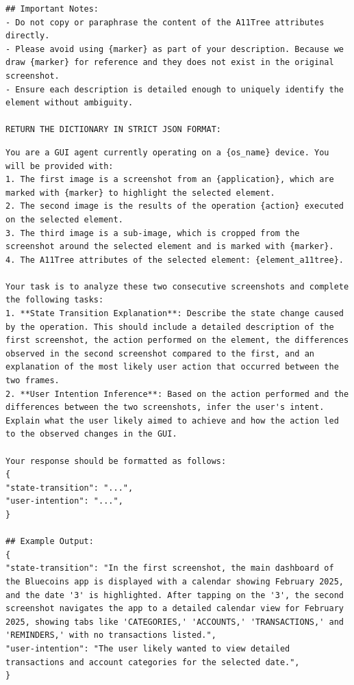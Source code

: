 \begin{tcolorbox}[title={Prompt For Element Appearance{,} Layout and Functionality}]
\begin{Verbatim}[breaklines=true, breaksymbol={}]
## Important Notes:
- Do not copy or paraphrase the content of the A11Tree attributes directly.
- Please avoid using {marker} as part of your description. Because we draw {marker} for reference and they does not exist in the original screenshot.
- Ensure each description is detailed enough to uniquely identify the element without ambiguity.

RETURN THE DICTIONARY IN STRICT JSON FORMAT:
\end{Verbatim}
\end{tcolorbox}

\begin{tcolorbox}[title=Prompt For Screen Transition Captioning and User Intention Prediction]
\scriptsize
\begin{Verbatim}[breaklines=true, breaksymbol={}]
You are a GUI agent currently operating on a {os_name} device. You will be provided with:
1. The first image is a screenshot from an {application}, which are marked with {marker} to highlight the selected element.
2. The second image is the results of the operation {action} executed on the selected element.
3. The third image is a sub-image, which is cropped from the screenshot around the selected element and is marked with {marker}.
4. The A11Tree attributes of the selected element: {element_a11tree}.
                           
Your task is to analyze these two consecutive screenshots and complete the following tasks:
1. **State Transition Explanation**: Describe the state change caused by the operation. This should include a detailed description of the first screenshot, the action performed on the element, the differences observed in the second screenshot compared to the first, and an explanation of the most likely user action that occurred between the two frames.
2. **User Intention Inference**: Based on the action performed and the differences between the two screenshots, infer the user's intent. Explain what the user likely aimed to achieve and how the action led to the observed changes in the GUI.

Your response should be formatted as follows:
{
"state-transition": "...",
"user-intention": "...",
}

## Example Output:
{
"state-transition": "In the first screenshot, the main dashboard of the Bluecoins app is displayed with a calendar showing February 2025, and the date '3' is highlighted. After tapping on the '3', the second screenshot navigates the app to a detailed calendar view for February 2025, showing tabs like 'CATEGORIES,' 'ACCOUNTS,' 'TRANSACTIONS,' and 'REMINDERS,' with no transactions listed.",
"user-intention": "The user likely wanted to view detailed transactions and account categories for the selected date.",
}


\end{Verbatim}
\end{tcolorbox}
